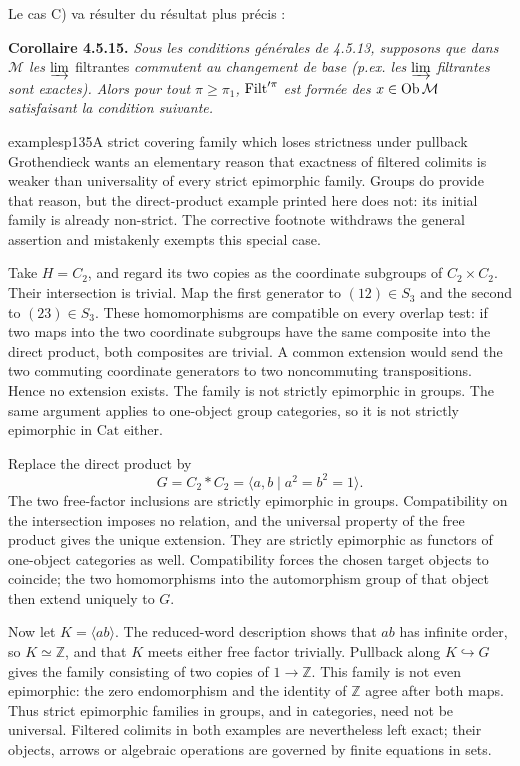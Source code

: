 Le cas C) va résulter du résultat plus précis :

\textbf{Corollaire 4.5.15.} \textit{Sous les conditions générales de 4.5.13, supposons que dans $\mathcal{M}$ les} $\varinjlim$
filtrantes \textit{commutent au changement de base (p.ex. les} $\varinjlim$ \textit{filtrantes sont exactes). Alors pour tout $\pi \geqslant \pi_1$,} $\operatorname{Filt}'^{\pi}$ \textit{est formée des $x \in \operatorname{Ob} \mathcal{M}$ satisfaisant la condition suivante.}

\begin{dcomment}{examples}{p135}{A strict covering family which loses strictness under pullback}
Grothendieck wants an elementary reason that exactness of filtered colimits is weaker than universality of every strict epimorphic family. Groups do provide that reason, but the direct-product example printed here does not: its initial family is already non-strict. The corrective footnote withdraws the general assertion and mistakenly exempts this special case.

Take $H=C_2$, and regard its two copies as the coordinate subgroups of $C_2\times C_2$. Their intersection is trivial. Map the first generator to $(12)\in S_3$ and the second to $(23)\in S_3$. These homomorphisms are compatible on every overlap test: if two maps into the two coordinate subgroups have the same composite into the direct product, both composites are trivial. A common extension would send the two commuting coordinate generators to two noncommuting transpositions. Hence no extension exists. The family is not strictly epimorphic in groups. The same argument applies to one-object group categories, so it is not strictly epimorphic in $\mathrm{Cat}$ either.

Replace the direct product by
\[
 G=C_2*C_2=\langle a,b\mid a^2=b^2=1\rangle.
\]
The two free-factor inclusions are strictly epimorphic in groups. Compatibility on the intersection imposes no relation, and the universal property of the free product gives the unique extension. They are strictly epimorphic as functors of one-object categories as well. Compatibility forces the chosen target objects to coincide; the two homomorphisms into the automorphism group of that object then extend uniquely to $G$.

Now let $K=\langle ab\rangle$. The reduced-word description shows that $ab$ has infinite order, so $K\simeq\mathbb Z$, and that $K$ meets either free factor trivially. Pullback along $K\hookrightarrow G$ gives the family consisting of two copies of $1\to\mathbb Z$. This family is not even epimorphic: the zero endomorphism and the identity of $\mathbb Z$ agree after both maps. Thus strict epimorphic families in groups, and in categories, need not be universal. Filtered colimits in both examples are nevertheless left exact; their objects, arrows or algebraic operations are governed by finite equations in sets.


\end{dcomment}
